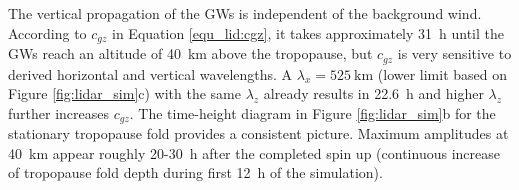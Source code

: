 The vertical propagation of the GWs is independent of the background wind. According to $c_{gz}$ in Equation \ref{equ_lid:cgz}, it takes approximately \SI{31}{\hour} until the GWs reach an altitude of \SI{40}{\kilo\meter} above the tropopause, but $c_{gz}$ is very sensitive to derived horizontal and vertical wavelengths. A $\lambda_x = \SI{525}{\kilo\meter}$ (lower limit based on Figure \ref{fig:lidar_sim}c) with the same $\lambda_z$ already results in \SI{22.6}{\hour} and higher $\lambda_z$ further increases $c_{gz}$. The time-height diagram in Figure \ref{fig:lidar_sim}b for the stationary tropopause fold provides a consistent picture. Maximum amplitudes at \SI{40}{\kilo\meter} appear roughly 20-\SI{30}{\hour} after the completed spin up (continuous increase of tropopause fold depth during first \SI{12}{\hour} of the simulation).


